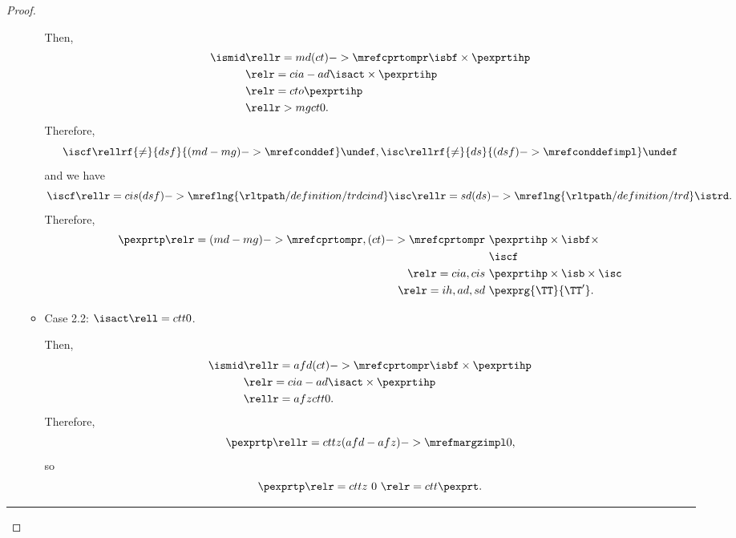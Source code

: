 \begin{proof}
\begin{itemize}
\begin{itemize}
          Then,
          \begin{align*}
            \ismid &\rellr = md {(ct)->\mrefcprtompr} \isbf \times \pexprtihp\\
                   &\relr = cia-ad \isact \times \pexprtihp\\
                   &\relr = cto \pexprtihp\\
                   &\rellr > mg ct 0.
          \end{align*}
          Therefore, 
          $$\iscf \rellrf{\ne}{dsf}{(md-mg)->\mrefconddef} \undef,\isc \rellrf{\ne}{ds}{(dsf)->\mrefconddefimpl} \undef$$
          and we have
          $$\iscf 
          \rellr = cis (dsf)->\mreflng{\rltpath/definition/trdcind} \isc 
          \rellr = sd (ds)->\mreflng{\rltpath/definition/trd} \istrd.$$
          Therefore,
          \begin{align*}
            \pexprtp 
            \relr = {(md-mg)->\mrefcprtompr,(ct)->\mrefcprtompr} \ & \pexprtihp \times \isbf \times\\& \iscf\\
            \relr = cia,cis \ & \pexprtihp \times \isb \times \isc\\
            \relr = ih,ad,sd \ & \pexprg{\TT}{\TT'}.
          \end{align*}
        \item {} Case 2.2: $\isact \rell = ctt 0$.

          Then,
          \begin{align*}
            \ismid &\rellr = afd {(ct)->\mrefcprtompr} \isbf \times \pexprtihp\\
                   &\relr = cia-ad \isact \times \pexprtihp\\
                   &\rellr = afz ctt 0.
          \end{align*}
          Therefore,
          $$\pexprtp \rellr = cttz {(afd-afz)->\mrefmargzimpl} 0,$$
          so
          $$\pexprtp
          \relr = cttz \ 0 \ 
          \relr = ctt \pexprt.$$
      \end{itemize}
  \end{itemize}
  \hrule
\end{proof}
